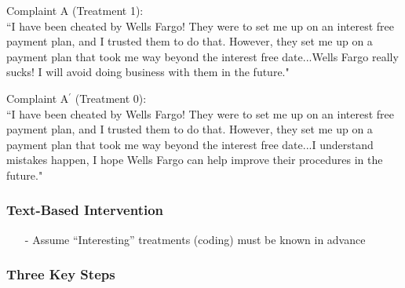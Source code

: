 \documentclass[xcolor=dvipsnames]{beamer}
\begin{document}
\begin{frame}


Complaint A (Treatment 1):\\
``I have been cheated by Wells Fargo! They were to set me up on an interest free payment plan, and I trusted them to do that. However, they set me up on a payment plan that took me way beyond the interest free date...\alert{Wells Fargo really sucks! I will avoid doing business with them in the future.}"

\vspace{0.25in}

Complaint A$^{'}$ (Treatment 0): \\
``I have been cheated by Wells Fargo! They were to set me up on an interest free payment plan, and I trusted them to do that. However, they set me up on a payment plan that took me way beyond the interest free date...\alert{I understand mistakes happen, I hope Wells Fargo can help improve their procedures in the future}."

\vspace{0.125in}
\pause
{}


\end{frame}



\begin{frame}
  \frametitle{Text-Based Intervention}

\Large

  \begin{itemize}
    \item[-] Assume ``Interesting'' treatments (coding) must be known in advance \pause   \medskip
     \pause
  \end{itemize}
 \end{frame}



\begin{frame}
  \frametitle{Three Key Steps}

\pause
  \Large
  \begin{enumerate}
     \pause
     \pause
  \end{enumerate}
\end{frame}
\end{document}
